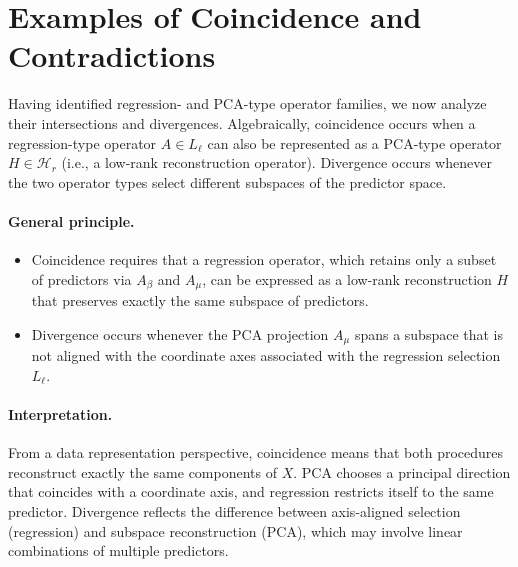 \section{Examples of Coincidence and Contradictions}


Having identified regression- and PCA-type operator families, we now analyze their intersections and divergences. Algebraically, coincidence occurs when a regression-type operator $A \in L_\ell$ can also be represented as a PCA-type operator $H \in \mathcal{H}_r$ (i.e., a low-rank reconstruction operator). Divergence occurs whenever the two operator types select different subspaces of the predictor space.

\paragraph{General principle.}  
\begin{itemize}
  \item Coincidence requires that a regression operator, which retains only a subset of predictors via $A_\beta$ and $A_\mu$, can be expressed as a low-rank reconstruction $H$ that preserves exactly the same subspace of predictors.
  \item Divergence occurs whenever the PCA projection $A_\mu$ spans a subspace that is not aligned with the coordinate axes associated with the regression selection $L_\ell$.
\end{itemize}

\paragraph{Interpretation.}  
From a data representation perspective, coincidence means that both procedures reconstruct exactly the same components of $X$. PCA chooses a principal direction that coincides with a coordinate axis, and regression restricts itself to the same predictor. Divergence reflects the difference between axis-aligned selection (regression) and subspace reconstruction (PCA), which may involve linear combinations of multiple predictors.

